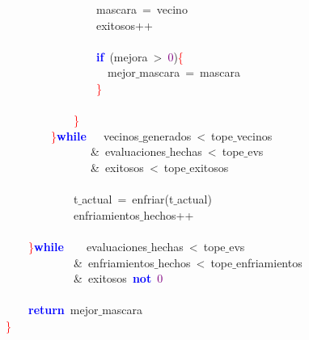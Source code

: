 \mbox{}\ \ \ \ \ \ \ \ \ \ \ \ \ \ \ \ mascara\ \textcolor{BrickRed}{=}\ vecino \\
\mbox{}\ \ \ \ \ \ \ \ \ \ \ \ \ \ \ \ exitosos\textcolor{BrickRed}{++} \\
\mbox{} \\
\mbox{}\ \ \ \ \ \ \ \ \ \ \ \ \ \ \ \ \textbf{\textcolor{Blue}{if}}\ \textcolor{BrickRed}{(}mejora\ \textcolor{BrickRed}{\textgreater{}}\ \textcolor{Purple}{0}\textcolor{BrickRed}{)}\textcolor{Red}{\{} \\
\mbox{}\ \ \ \ \ \ \ \ \ \ \ \ \ \ \ \ \ \ mejor$\_$mascara\ \textcolor{BrickRed}{=}\ mascara \\
\mbox{}\ \ \ \ \ \ \ \ \ \ \ \ \ \ \ \ \textcolor{Red}{\}} \\
\mbox{} \\
\mbox{}\ \ \ \ \ \ \ \ \ \ \ \ \textcolor{Red}{\}} \\
\mbox{}\ \ \ \ \ \ \ \ \textcolor{Red}{\}}\textbf{\textcolor{Blue}{while}}\ \ \ vecinos$\_$generados\ \textcolor{BrickRed}{\textless{}}\ tope$\_$vecinos \\
\mbox{}\ \ \ \ \ \ \ \ \ \ \ \ \ \ \ \textcolor{BrickRed}{\&}\ evaluaciones$\_$hechas\ \textcolor{BrickRed}{\textless{}}\ tope$\_$evs \\
\mbox{}\ \ \ \ \ \ \ \ \ \ \ \ \ \ \ \textcolor{BrickRed}{\&}\ exitosos\ \textcolor{BrickRed}{\textless{}}\ tope$\_$exitosos \\
\mbox{} \\
\mbox{}\ \ \ \ \ \ \ \ \ \ \ \ t$\_$actual\ \textcolor{BrickRed}{=}\ enfriar\textcolor{BrickRed}{(}t$\_$actual\textcolor{BrickRed}{)} \\
\mbox{}\ \ \ \ \ \ \ \ \ \ \ \ enfriamientos$\_$hechos\textcolor{BrickRed}{++} \\
\mbox{} \\
\mbox{}\ \ \ \ \textcolor{Red}{\}}\textbf{\textcolor{Blue}{while}}\ \ \ \ evaluaciones$\_$hechas\ \textcolor{BrickRed}{\textless{}}\ tope$\_$evs \\
\mbox{}\ \ \ \ \ \ \ \ \ \ \ \ \textcolor{BrickRed}{\&}\ enfriamientos$\_$hechos\ \textcolor{BrickRed}{\textless{}}\ tope$\_$enfriamientos \\
\mbox{}\ \ \ \ \ \ \ \ \ \ \ \ \textcolor{BrickRed}{\&}\ exitosos\ \textbf{\textcolor{Blue}{not}}\ \textcolor{Purple}{0} \\
\mbox{} \\
\mbox{}\ \ \ \ \textbf{\textcolor{Blue}{return}}\ mejor$\_$mascara \\
\mbox{}\textcolor{Red}{\}} \\
\mbox{}
